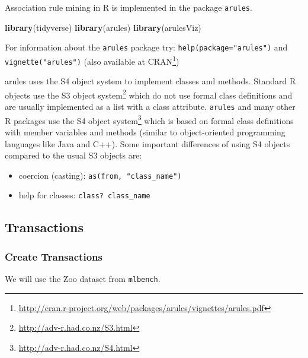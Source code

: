 \documentclass[
  notitlepage]{book}
\newenvironment{Shaded}{\begin{snugshade}}{\end{snugshade}}
\newcommand{\KeywordTok}[1]{\textcolor[rgb]{0.13,0.29,0.53}{\textbf{#1}}}
\newcommand{\NormalTok}[1]{#1}
\DeclareRobustCommand{\href}[2]{#2\footnote{\url{#1}}}
\providecommand{\tightlist}{%
  \setlength{\itemsep}{0pt}\setlength{\parskip}{0pt}}
\begin{document}
Association rule mining in R is implemented in the package \texttt{arules}.

\begin{Shaded}
\begin{Highlighting}[]
\KeywordTok{library}\NormalTok{(tidyverse)}
\KeywordTok{library}\NormalTok{(arules)}
\KeywordTok{library}\NormalTok{(arulesViz)}
\end{Highlighting}
\end{Shaded}

For information about the \texttt{arules} package try: \texttt{help(package="arules")}
and \texttt{vignette("arules")} (also available at
\href{http://cran.r-project.org/web/packages/arules/vignettes/arules.pdf}{CRAN})

arules uses the S4 object system to implement classes and methods.
Standard R objects use the \href{http://adv-r.had.co.nz/S3.html}{S3 object
system} which do not use formal class
definitions and are usually implemented as a list with a class
attribute. \texttt{arules} and many other R packages use the \href{http://adv-r.had.co.nz/S4.html}{S4 object
system} which is based on formal class
definitions with member variables and methods (similar to
object-oriented programming languages like Java and C++). Some important
differences of using S4 objects compared to the usual S3 objects are:

\begin{itemize}
\tightlist
\item
  coercion (casting): \texttt{as(from,\ "class\_name")}
\item
  help for classes: \texttt{class?\ class\_name}
\end{itemize}

\hypertarget{transactions}{%
\subsection{Transactions}\label{transactions}}

\hypertarget{create-transactions}{%
\subsubsection{Create Transactions}\label{create-transactions}}

We will use the Zoo dataset from \texttt{mlbench}.
\end{document}
